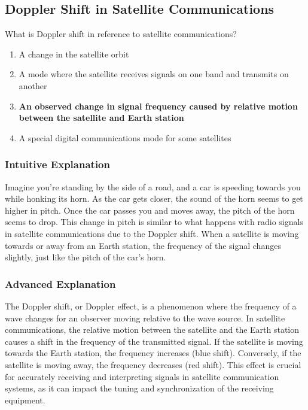 \subsection{Doppler Shift in Satellite Communications}
\label{T8B07}

\begin{tcolorbox}[colback=gray!10!white,colframe=black!75!black,title=T8B07]
What is Doppler shift in reference to satellite communications?
\begin{enumerate}[noitemsep]
    \item A change in the satellite orbit
    \item A mode where the satellite receives signals on one band and transmits on another
    \item \textbf{An observed change in signal frequency caused by relative motion between the satellite and Earth station}
    \item A special digital communications mode for some satellites
\end{enumerate}
\end{tcolorbox}

\subsubsection*{Intuitive Explanation}
Imagine you're standing by the side of a road, and a car is speeding towards you while honking its horn. As the car gets closer, the sound of the horn seems to get higher in pitch. Once the car passes you and moves away, the pitch of the horn seems to drop. This change in pitch is similar to what happens with radio signals in satellite communications due to the Doppler shift. When a satellite is moving towards or away from an Earth station, the frequency of the signal changes slightly, just like the pitch of the car's horn.

\subsubsection*{Advanced Explanation}
The Doppler shift, or Doppler effect, is a phenomenon where the frequency of a wave changes for an observer moving relative to the wave source. In satellite communications, the relative motion between the satellite and the Earth station causes a shift in the frequency of the transmitted signal. If the satellite is moving towards the Earth station, the frequency increases (blue shift). Conversely, if the satellite is moving away, the frequency decreases (red shift). This effect is crucial for accurately receiving and interpreting signals in satellite communication systems, as it can impact the tuning and synchronization of the receiving equipment.

